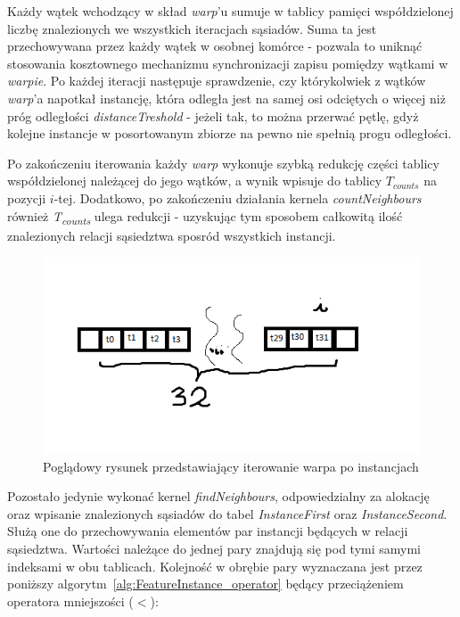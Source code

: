 \documentclass[12pt]{article}
\begin{document}
Każdy wątek wchodzący w skład \textit{warp}'u sumuje w tablicy pamięci współdzielonej liczbę znalezionych we wszystkich iteracjach sąsiadów. Suma ta jest przechowywana przez każdy wątek w osobnej komórce - pozwala to uniknąć stosowania kosztownego mechanizmu synchronizacji zapisu pomiędzy wątkami w \textit{warpie}. Po każdej iteracji następuje sprawdzenie, czy którykolwiek z wątków \textit{warp}'a napotkał instancję, która odległa jest na samej osi odciętych o więcej niż próg odległości \textit{distanceTreshold} - jeżeli tak, to można przerwać pętlę, gdyż kolejne instancje w posortowanym zbiorze na pewno nie spełnią progu odległości.

Po zakończeniu iterowania każdy \textit{warp} wykonuje szybką redukcję części tablicy współdzielonej należącej do jego wątków, a wynik wpisuje do tablicy \textit{$ T_{counts} $} na pozycji $i$-tej. Dodatkowo, po zakończeniu działania kernela  \textit{countNeighbours} również \textit{T\textsubscript{counts}} ulega redukcji - uzyskując tym sposobem całkowitą ilość znalezionych relacji sąsiedztwa sposród wszystkich instancji.


\begin{figure}[H]
\centering
\includegraphics{planesweep}
\caption{Poglądowy rysunek przedstawiający iterowanie warpa po instancjach}
\end{figure}

Pozostało jedynie wykonać kernel \textit{findNeighbours}, odpowiedzialny za alokację oraz wpisanie znalezionych sąsiadów do tabel \textit{InstanceFirst} oraz \textit{InstanceSecond}. Służą one do przechowywania elementów par instancji będących w relacji sąsiedztwa. Wartości należące do jednej pary znajdują się pod tymi samymi indeksami w obu tablicach. Kolejność w obrębie pary wyznaczana jest przez poniższy algorytm~\ref{alg:FeatureInstance_operator} będący przeciążeniem operatora mniejszości ($ < $):
\end{document}
